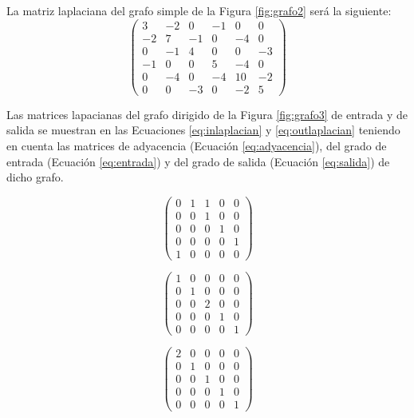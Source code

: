 \begin{exampleth}
La matriz laplaciana del grafo simple de la Figura \ref{fig:grafo2} será la siguiente:
\begin{equation}
\begin{pmatrix}
3 & -2 & 0 & -1 & 0 & 0\\
-2 & 7 & -1 & 0 & -4 & 0\\
0 & -1 & 4 & 0 & 0 & -3\\
-1 & 0 & 0 & 5 & -4 & 0\\
0 & -4 & 0 & -4 & 10 & -2\\
0 & 0 & -3 & 0 & -2 & 5
\end{pmatrix}
\end{equation}
\end{exampleth}

\begin{exampleth}
Las matrices lapacianas del grafo dirigido de la Figura \ref{fig:grafo3} de entrada y de salida se muestran en las Ecuaciones \ref{eq:inlaplacian} y \ref{eq:outlaplacian} teniendo en cuenta las matrices de adyacencia (Ecuación \ref{eq:adyacencia}), del grado de entrada (Ecuación \ref{eq:entrada}) y del grado de salida (Ecuación \ref{eq:salida}) de dicho grafo.

\begin{equation}
\begin{pmatrix}
0 & 1 & 1 & 0 & 0\\
0 & 0 & 1 & 0 & 0\\
0 & 0 & 0 & 1 & 0\\
0 & 0 & 0 & 0 & 1\\
1 & 0 & 0 & 0 & 0
\end{pmatrix}
\label{eq:adyacencia}
\end{equation}

\begin{equation}
\begin{pmatrix}
1 & 0 & 0 & 0 & 0\\
0 & 1 & 0 & 0 & 0\\
0 & 0 & 2 & 0 & 0\\
0 & 0 & 0 & 1 & 0\\
0 & 0 & 0 & 0 & 1
\end{pmatrix}
\label{eq:entrada}
\end{equation}

\begin{equation}
\begin{pmatrix}
2 & 0 & 0 & 0 & 0\\
0 & 1 & 0 & 0 & 0\\
0 & 0 & 1 & 0 & 0\\
0 & 0 & 0 & 1 & 0\\
0 & 0 & 0 & 0 & 1
\end{pmatrix}
\label{eq:salida}
\end{equation}


\end{exampleth}
